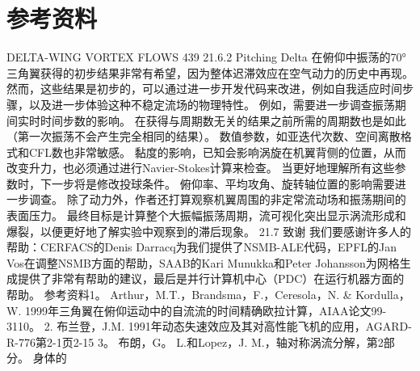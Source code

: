 \documentclass[UTF8,11pt,a4paper,openany,fontset=fandol]{ctexbook}
\begin{document}
\section{参考资料}
DELTA-WING VORTEX FLOWS 439 21.6.2 Pitching Delta 在俯仰中振荡的70° 三角翼获得的初步结果非常有希望，因为整体迟滞效应在空气动力的历史中再现。 然而，这些结果是初步的，可以通过进一步开发代码来改进，例如自我适应时间步骤，以及进一步体验这种不稳定流场的物理特性。 例如，需要进一步调查振荡期间实时时间步数的影响。 在获得与周期数无关的结果之前所需的周期数也是如此（第一次振荡不会产生完全相同的结果）。 数值参数，如亚迭代次数、空间离散格式和CFL数也非常敏感。 黏度的影响，已知会影响涡旋在机翼背侧的位置，从而改变升力，也必须通过进行Navier-Stokes计算来检查。 当更好地理解所有这些参数时，下一步将是修改投球条件。 俯仰率、平均攻角、旋转轴位置的影响需要进一步调查。 除了动力外，作者还打算观察机翼周围的非定常流动场和振荡期间的表面压力。 最终目标是计算整个大振幅振荡周期，流可视化突出显示涡流形成和爆裂，以便更好地了解实验中观察到的滞后现象。 21.7 致谢 我们要感谢许多人的帮助：CERFACS的Denis Darracq为我们提供了NSMB-ALE代码，EPFL的Jan Vos在调整NSMB方面的帮助，SAAB的Kari Munukka和Peter Johansson为网格生成提供了非常有帮助的建议，最后是并行计算机中心（PDC）在运行机器方面的帮助。 参考资料1。 Arthur，M.T.，Brandsma，F.，Ceresola，N. \& Kordulla，W. 1999年三角翼在俯仰运动中的自流流的时间精确欧拉计算，AIAA论文99-3110。 2. 布兰登，J.M. 1991年动态失速效应及其对高性能飞机的应用，AGARD-R-776第2-1页2-15 3。 布朗，G。 L.和Lopez，J. M.，轴对称涡流分解，第2部分。 身体的
\end{document}
